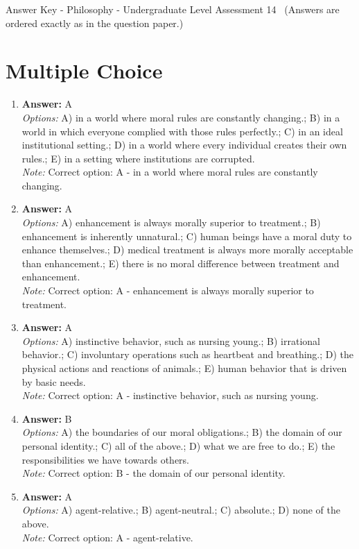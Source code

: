 \documentclass[12pt]{article}
\begin{document}
\begin{center}
Answer Key - Philosophy - Undergraduate Level Assessment 14 \
\small (Answers are ordered exactly as in the question paper.)
\end{center}

\section*{Multiple Choice}
\begin{enumerate}[label=\arabic*.]
\item \textbf{Answer:} A
\\ \textit{Options:} A) in a world where moral rules are constantly changing.; B) in a world in which everyone complied with those rules perfectly.; C) in an ideal institutional setting.; D) in a world where every individual creates their own rules.; E) in a setting where institutions are corrupted.
\\ \textit{Note:} Correct option: A - in a world where moral rules are constantly changing.
\item \textbf{Answer:} A
\\ \textit{Options:} A) enhancement is always morally superior to treatment.; B) enhancement is inherently unnatural.; C) human beings have a moral duty to enhance themselves.; D) medical treatment is always more morally acceptable than enhancement.; E) there is no moral difference between treatment and enhancement.
\\ \textit{Note:} Correct option: A - enhancement is always morally superior to treatment.
\item \textbf{Answer:} A
\\ \textit{Options:} A) instinctive behavior, such as nursing young.; B) irrational behavior.; C) involuntary operations such as heartbeat and breathing.; D) the physical actions and reactions of animals.; E) human behavior that is driven by basic needs.
\\ \textit{Note:} Correct option: A - instinctive behavior, such as nursing young.
\item \textbf{Answer:} B
\\ \textit{Options:} A) the boundaries of our moral obligations.; B) the domain of our personal identity.; C) all of the above.; D) what we are free to do.; E) the responsibilities we have towards others.
\\ \textit{Note:} Correct option: B - the domain of our personal identity.
\item \textbf{Answer:} A
\\ \textit{Options:} A) agent-relative.; B) agent-neutral.; C) absolute.; D) none of the above.
\\ \textit{Note:} Correct option: A - agent-relative.
\end{enumerate}
\end{document}
